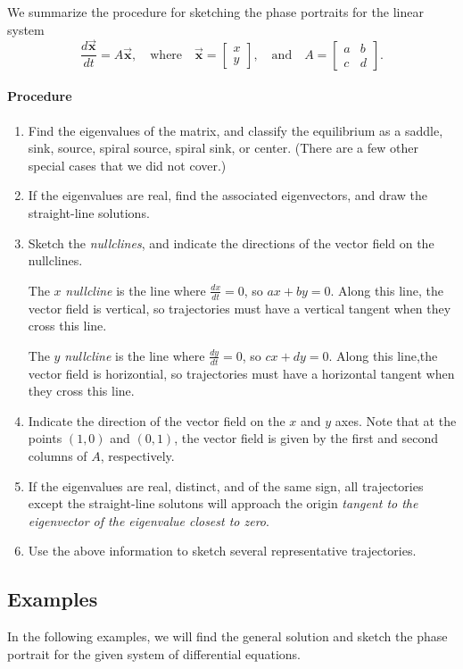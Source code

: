 \documentclass{book}
\newcommand{\BX}{\vec{\textbf{x}}}
\begin{document}
\noindent
We summarize the procedure for sketching the phase portraits for
the linear system
\[
    \frac{d\BX}{dt} = A\BX, \quad \textrm{where} \quad
    \BX=\begin{bmatrix} x \\ y \end{bmatrix},
    \quad \textrm{and} \quad
    A = \begin{bmatrix} a & b \\ c & d \end{bmatrix}.
\]
\paragraph{Procedure}
\begin{enumerate}
\item
Find the eigenvalues of the matrix, and classify the equilibrium as a
saddle, sink, source, spiral source, spiral sink, or center.
(There are a few other special cases that we did not cover.)
\item
If the eigenvalues are real, find the associated eigenvectors, and
draw the straight-line solutions.
\item  Sketch the \emph{nullclines}, and indicate the
directions of the vector field on the nullclines.

The $x$ \emph{nullcline} is the line where $\frac{dx}{dt}=0$,
so $ax+by=0$. Along this line, the vector field is vertical, so trajectories
must have a vertical tangent when they cross this line.

The $y$ \emph{nullcline} is the line where $\frac{dy}{dt}=0$, so
$cx+dy=0$.  Along this line,the vector field is horizontial, so
trajectories must have a horizontal tangent when they cross this line.
 
\item Indicate the direction of the vector field on the $x$ and $y$ axes.
Note that at the points $(1,0)$ and $(0,1)$, the
vector field is given by the first and second columns of $A$, respectively.
\item
If the eigenvalues are real, distinct, and of the same sign,
all trajectories except the straight-line solutons
will approach the origin \emph{tangent to the eigenvector
of the eigenvalue closest to zero}.
\item Use the above information to sketch several representative trajectories.
\end{enumerate}

\subsection*{Examples}
In the following examples, we will find the general solution and sketch
the phase portrait for the given system of differential equations.
\end{document}
